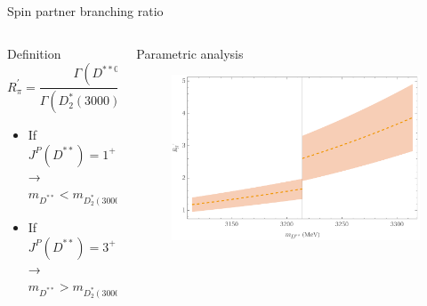 \documentclass[professionalfonts,aspectratio=169]{beamer}
\begin{document}
\begin{frame}{Spin partner branching ratio}
    \begin{columns}
      \begin{column}[t]{0.5\textwidth}
        \begin{block}{Definition}
          \vspace{0pt}
          \scriptsize
          \begin{equation*}
            R^\prime_\pi = \frac{\Gamma \left( D^{**0} \rightarrow D^{* +} \pi^- \right) + \Gamma \left( D^{**0} \rightarrow D^{* 0} \pi^0 \right)}{\Gamma \left( D_2^*(3000)^0 \rightarrow D^+ \pi^- \right) + \Gamma \left( D_2^*(3000)^0 \rightarrow D^0 \pi^0 \right)} 
          \end{equation*}
        \end{block}
        \begin{itemize}
          \scriptsize
          \item
            If $J^P(D^{**}) = 1^+$ → $m_{D^{**}} < m_{D^*_2(3000)}$
          \item
            If $J^P(D^{**}) = 3^+$ → $m_{D^{**}} > m_{D^*_2(3000)}$
        \end{itemize}
      \end{column}
      \pause
      \begin{column}[t]{0.5\textwidth}
        \begin{block}{Parametric analysis}
          \vspace{0pt}
          \begin{figure}
            \center
            \includegraphics[width=\textwidth]{../figures/plot.pdf}
          \end{figure}
        \end{block}
      \end{column}
    \end{columns}
\end{frame}
\end{document}
